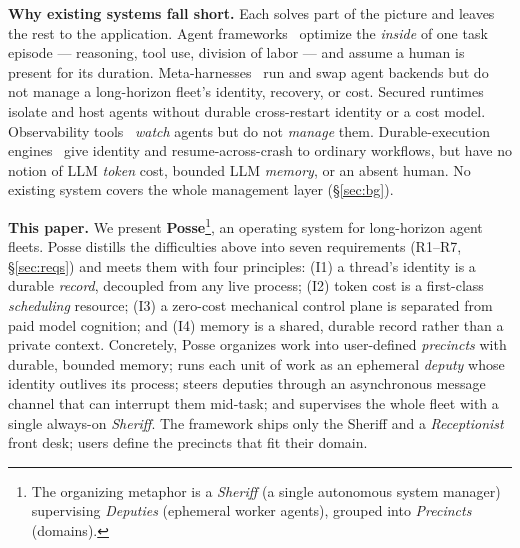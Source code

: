 \documentclass[10pt,twocolumn]{article}
\begin{document}
\noindent\textbf{Why existing systems fall short.} Each solves part of the picture and
leaves the rest to the application. Agent frameworks~\cite{langgraph,autogen,crewai,metagpt}
optimize the \emph{inside} of one task episode --- reasoning, tool use, division of
labor --- and assume a human is present for its duration. Meta-harnesses~\cite{omnigent,exo}
run and swap agent backends but do not manage a long-horizon fleet's identity,
recovery, or cost. Secured runtimes~\cite{nemoclaw,openhands} isolate and host agents
without durable cross-restart identity or a cost model. Observability
tools~\cite{langfuse,agentops,phoenix} \emph{watch} agents but do not \emph{manage}
them. Durable-execution engines~\cite{temporal,stepfns} give identity and
resume-across-crash to ordinary workflows, but have no notion of LLM \emph{token} cost,
bounded LLM \emph{memory}, or an absent human. No existing system covers the whole
management layer (\S\ref{sec:bg}).

\noindent\textbf{This paper.} We present \textbf{Posse}\footnote{The organizing
metaphor is a \emph{Sheriff} (a single autonomous system manager) supervising
\emph{Deputies} (ephemeral worker agents), grouped into \emph{Precincts} (domains).},
an operating system for long-horizon agent fleets. Posse distills the difficulties
above into seven requirements (R1--R7, \S\ref{sec:reqs}) and meets them with four
principles: (I1) a thread's identity is a durable \emph{record}, decoupled from any
live process; (I2) token cost is a first-class \emph{scheduling} resource; (I3) a
zero-cost mechanical control plane is separated from paid model cognition; and (I4)
memory is a shared, durable record rather than a private context. Concretely,
Posse organizes work into user-defined \emph{precincts} with durable, bounded memory;
runs each unit of work as an ephemeral \emph{deputy} whose identity outlives its
process; steers deputies through an asynchronous message channel that can interrupt
them mid-task; and supervises the whole fleet with a single always-on \emph{Sheriff}.
The framework ships only the Sheriff and a \emph{Receptionist} front desk; users define
the precincts that fit their domain.
\end{document}
